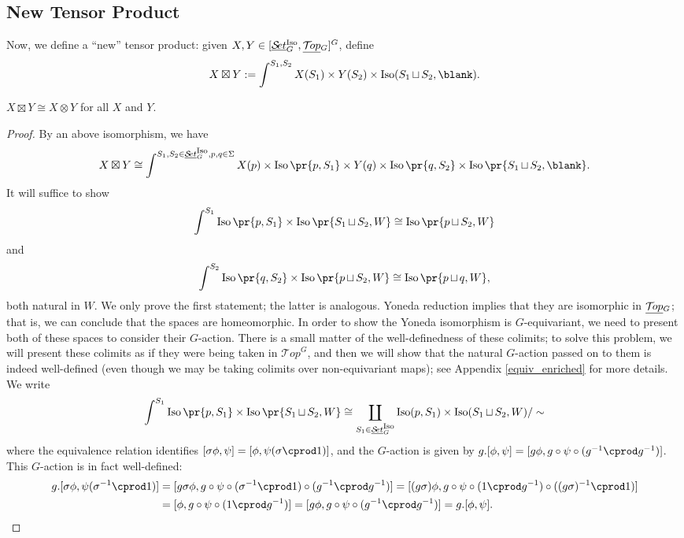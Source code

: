 \documentclass{report}
\newcommand{\Top}{\text{$\mathcal{T}\!op$}}
\newcommand{\Set}{\text{$\mathcal{S}\!et$}}
\DeclareMathOperator{\Iso}{Iso}
\newcommand{\iso}[1]{\text{$\Iso\pr{#1}$}}
\newcommand{\TopG}{\text{\underline{$\Top$}$_G$}}
\newcommand{\SetG}{\text{\underline{$\Set$}$_G^{\mbox{\scriptsize Iso}}$}}
\renewcommand{\ST}{\text{$[\SetG,\TopG]^G$}}
\newcommand{\ico}{\operatornamewithlimits{\sqcup}}
\begin{document}
\subsection{New Tensor Product}
Now, we define a ``new'' tensor product: given $X,Y\in \ST$, define
\[X\boxtimes Y:= \int^{S_1,S_2}X(S_1)\times Y(S_2)\times \Iso(S_1\ico S_2,\blank).\]
\begin{lemma}
  $X\boxtimes Y \cong X\otimes Y$ for all $X$ and $Y$.
\end{lemma}
\begin{proof}
  By an above isomorphism, we have
  \begin{align*}
    X\boxtimes Y \cong\int^{S_1,S_2\in\SetG, p,q\in\Sigma}X(p)\times \iso{p,S_1}\times Y(q)\times\iso{q,S_2} \times \iso{S_1\ico S_2,\blank}. 
  \end{align*}
  It will suffice to show 
  \[\int^{S_1}\iso{p,S_1}\times\iso{S_1\ico S_2,W}\cong \iso{p\ico S_2,W}\]
  and 
  \[\int^{S_2}\iso{q,S_2}\times\iso{p\ico S_2,W}\cong \iso{p\ico q,W},\]
  both natural in $W$. We only prove the first statement; the latter is analogous. Yoneda reduction implies that they are isomorphic in $\TopG$; that is, we can conclude that the spaces are homeomorphic. In order to show the Yoneda isomorphism is $G$-equivariant, we need to present both of these spaces to consider their $G$-action. There is a small matter of the well-definedness of these colimits; to solve this problem, we will present these colimits as if they were being taken in $\Top^G$, and then we will show that the natural $G$-action passed on to them is indeed well-defined (even though we may be taking colimits over non-equivariant maps); see Appendix \ref{equiv_enriched} for more details. We write
  \[\int^{S_1}\iso{p,S_1}\times\iso{S_1\ico S_2,W} \cong \coprod_{S_1\in\SetG}\Iso(p,S_1)\times \Iso(S_1\ico S_2,W)/\sim\]
  where the equivalence relation identifies $[\sigma\phi,\psi] = [\phi,\psi(\sigma\cprod 1)]$, and the $G$-action is given by $g.[\phi,\psi] = [g\phi, g\circ\psi \circ (g^{-1}\cprod g^{-1})]$. This $G$-action is in fact well-defined:
  \begin{align*}
    g.[\sigma\phi,\psi(\sigma^{-1}\cprod 1)] &= [g\sigma\phi,g\circ \psi\circ (\sigma^{-1}\cprod 1)\circ (g^{-1}\cprod g^{-1})] =[(g\sigma)\phi,g\circ\psi\circ(1\cprod g^{-1})\circ((g\sigma)^{-1}\cprod 1)]\\
    &= [\phi,g\circ\psi \circ (1\cprod g^{-1})] =[g\phi,g\circ \psi \circ (g^{-1}\cprod g^{-1})] = g.[\phi,\psi].
  \end{align*}


\end{proof}
\end{document}
